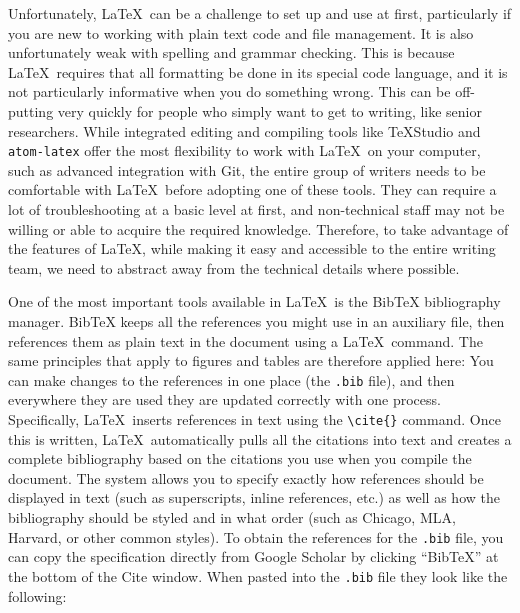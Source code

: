 Unfortunately, \LaTeX\ can be a challenge to set up and use at first,
particularly if you are new to working with plain text code and file management.
It is also unfortunately weak with spelling and grammar checking.
This is because \LaTeX\ requires that all formatting be done in its special code language,
and it is not particularly informative when you do something wrong.
This can be off-putting very quickly for people
who simply want to get to writing, like senior researchers.
While integrated editing and compiling tools like TeXStudio
and \texttt{atom-latex}
offer the most flexibility to work with \LaTeX\ on your computer,
such as advanced integration with Git,
the entire group of writers needs to be comfortable
with \LaTeX\ before adopting one of these tools.
They can require a lot of troubleshooting at a basic level at first,
and non-technical staff may not be willing or able to acquire the required knowledge.
Therefore, to take advantage of the features of \LaTeX,
while making it easy and accessible to the entire writing team,
we need to abstract away from the technical details where possible.

One of the most important tools available in \LaTeX\ is the BibTeX bibliography manager.
BibTeX keeps all the references you might use in an auxiliary file,
then references them as plain text in the document using a \LaTeX\ command.
The same principles that apply to figures and tables are therefore applied here:
You can make changes to the references in one place (the \texttt{.bib} file),
and then everywhere they are used they are updated correctly with one process.
Specifically, \LaTeX\ inserts references in text using the \texttt{\textbackslash cite\{\}} command.
Once this is written, \LaTeX\ automatically pulls all the citations into text
and creates a complete bibliography based on the citations you use when you compile the document.
The system allows you to specify exactly how references should be displayed in text
(such as superscripts, inline references, etc.)
as well as how the bibliography should be styled and in what order
(such as Chicago, MLA, Harvard, or other common styles).
To obtain the references for the \texttt{.bib} file,
you can copy the specification directly from Google Scholar
by clicking ``BibTeX'' at the bottom of the Cite window.
When pasted into the \texttt{.bib} file they look like the following:

